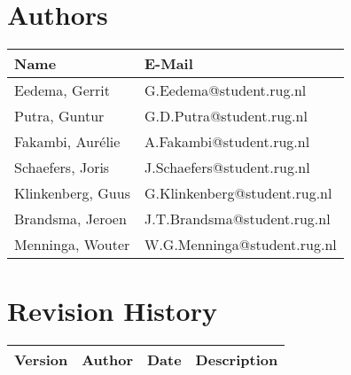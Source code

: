 \section*{Authors}

\begin{tabular}{ l l }
    \textbf{Name} & \textbf{E-Mail} \\ \hline
	Eedema, Gerrit & G.Eedema@student.rug.nl\\
	Putra, Guntur & G.D.Putra@student.rug.nl\\
	Fakambi, Aurélie & A.Fakambi@student.rug.nl\\
	Schaefers, Joris & J.Schaefers@student.rug.nl\\
	Klinkenberg, Guus & G.Klinkenberg@student.rug.nl\\
	Brandsma, Jeroen & J.T.Brandsma@student.rug.nl\\
	Menninga, Wouter & W.G.Menninga@student.rug.nl\\ \hline
\end{tabular}

\section*{Revision History}
\begin{tabularx}{\textwidth}{ l l l l}
    \textbf{Version} & \textbf{Author} &  \textbf{Date} & \textbf{Description}\\ \hline
\end{tabularx}